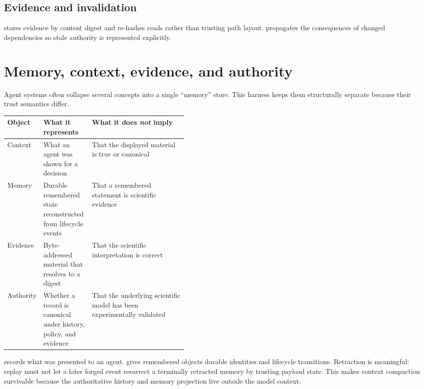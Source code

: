\subsection{Evidence and invalidation}
 stores evidence by content digest and re-hashes reads rather than trusting path layout.  propagates the consequences of changed dependencies so stale authority is represented explicitly.

\section{Memory, context, evidence, and authority}

Agent systems often collapse several concepts into a single ``memory'' store. This harness keeps them structurally separate because their trust semantics differ.

\begin{table}[htbp]
\centering
\small
\begin{tabularx}{\linewidth}{@{}p{0.16\linewidth}p{0.27\linewidth}X@{}}
\toprule
Object & What it represents & What it does \emph{not} imply \\
\midrule
Context & What an agent was shown for a decision & That the displayed material is true or canonical\\
Memory & Durable remembered state reconstructed from lifecycle events & That a remembered statement is scientific evidence\\
Evidence & Byte-addressed material that resolves to a digest & That the scientific interpretation is correct\\
Authority & Whether a record is canonical under history, policy, and evidence & That the underlying scientific model has been experimentally validated\\
\bottomrule
\end{tabularx}
\end{table}

 records what was presented to an agent.  gives remembered objects durable identities and lifecycle transitions. Retraction is meaningful: replay must not let a later forged event resurrect a terminally retracted memory by trusting payload state. This makes context compaction survivable because the authoritative history and memory projection live outside the model context.

